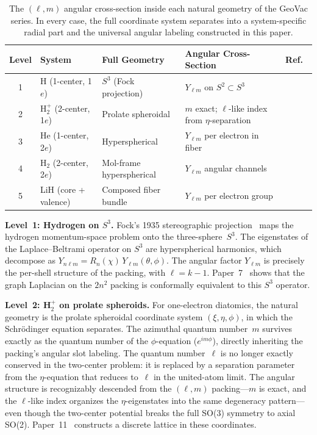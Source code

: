 \documentclass[aps,prl,reprint,amsmath,amssymb]{revtex4-2}
\begin{document}
\begin{table}[h]
\centering
\begin{tabular}{cllll}
\toprule
Level & System & Full Geometry & Angular Cross-Section & Ref.\ \\
\midrule
1 & H (1-center, 1$e$)
  & $S^3$ (Fock projection)
  & $Y_{\ell m}$ on $S^2 \subset S^3$
  & \cite{paper7} \\
2 & H$_2^+$ (2-center, 1$e$)
  & Prolate spheroidal
  & $m$ exact; $\ell$-like index from $\eta$-separation
  & \cite{paper11} \\
3 & He (1-center, 2$e$)
  & Hyperspherical
  & $Y_{\ell m}$ per electron in fiber
  & \cite{paper13} \\
4 & H$_2$ (2-center, 2$e$)
  & Mol-frame hyperspherical
  & $Y_{\ell m}$ angular channels
  & \cite{paper15} \\
5 & LiH (core + valence)
  & Composed fiber bundle
  & $Y_{\ell m}$ per electron group
  & \cite{paper17} \\
\bottomrule
\end{tabular}
\caption{The $(\ell, m)$ angular cross-section inside each natural
  geometry of the GeoVac series.  In every case, the full coordinate
  system separates into a system-specific radial part and the
  universal angular labeling constructed in this paper.}
\label{tab:cross-section}
\end{table}

\textbf{Level~1: Hydrogen on $S^3$.}
Fock's 1935 stereographic projection~\cite{fock1935} maps the hydrogen
momentum-space problem onto the three-sphere~$S^3$.  The eigenstates
of the Laplace--Beltrami operator on $S^3$ are hyperspherical
harmonics, which decompose as $Y_{n\ell m} = R_n(\chi) \,
Y_{\ell m}(\theta, \phi)$.  The angular factor $Y_{\ell m}$ is
precisely the per-shell structure of the packing, with $\ell = k - 1$.
Paper~7~\cite{paper7} shows that the graph Laplacian on the $2n^2$
packing is conformally equivalent to this $S^3$ operator.

\textbf{Level~2: H$_2^+$ on prolate spheroids.}
For one-electron diatomics, the natural geometry is the prolate
spheroidal coordinate system $(\xi, \eta, \phi)$, in which the
Schr\"odinger equation separates.  The azimuthal quantum number~$m$
survives exactly as the quantum number of the $\phi$-equation
($e^{im\phi}$), directly inheriting the packing's angular slot
labeling.  The quantum number~$\ell$ is no longer exactly conserved in
the two-center problem: it is replaced by a separation parameter from
the $\eta$-equation that reduces to~$\ell$ in the united-atom limit.
The angular structure is recognizably descended from the $(\ell, m)$
packing---$m$ is exact, and the $\ell$-like index organizes the
$\eta$-eigenstates into the same degeneracy pattern---even though the
two-center potential breaks the full SO(3) symmetry to axial SO(2).
Paper~11~\cite{paper11} constructs a discrete lattice in these
coordinates.
\end{document}
